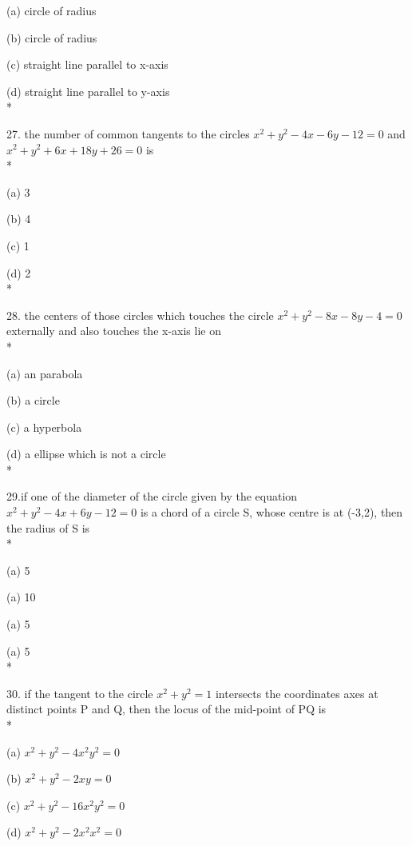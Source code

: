 \documentclass{article}
\begin{document}
\choice (a) circle of radius 

\choice (b) circle of radius 

\choice (c) straight line parallel to x-axis

\choice (d) straight line parallel to y-axis\\*

27. the number of common tangents to the circles   $x^2+y^2-4x-6y-12=0$ and $x^2+y^2+6x+18y+26=0$ is\\*

\choice (a) 3

\choice (b) 4

\choice (c) 1

\choice (d) 2\\*

28. the centers of those circles which touches the circle $x^2+y^2-8x-8y-4=0$ externally and also touches the x-axis lie on\\*

\choice (a) an parabola

\choice (b) a circle 

\choice (c) a hyperbola

\choice (d) a ellipse which is not a circle\\*

29.if one of the diameter of the circle given by the equation $x^2+y^2-4x+6y-12=0$  is a chord of a circle S, whose centre is at (-3,2), then the radius of S is\\*

\choice (a) 5

\choice (a) 10

\choice (a) 5

\choice (a) 5\\*

30. if the tangent to the circle $x^2+y^2=1$ intersects the coordinates axes at distinct points P and Q, then the locus of the mid-point of PQ is\\*

\choice (a) $x^2+y^2-4x^2y^2=0$

\choice (b) $x^2+y^2-2xy=0$

\choice (c) $x^2+y^2-16x^2y^2=0$

\choice (d) $x^2+y^2-2x^2x^2=0$
\end{document}
